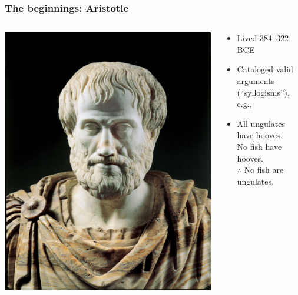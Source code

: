 \begin{frame}
  \frametitle{The beginnings: Aristotle}
  \begin{columns}
    \begin{column}{.5\textwidth}
    \includegraphics[width=\textwidth]{../assets/aristotle}
    \end{column}
    \begin{column}{.5\textwidth}
      \begin{itemize}
        \item Lived 384--322 BCE
        \item Cataloged valid arguments (``syllogisms''), e.g.,
        \item All ungulates have hooves.\\
        No fish have hooves.\\
        $\therefore$ No fish are ungulates.
      \end{itemize}
    \end{column}
  \end{columns}
\end{frame}

